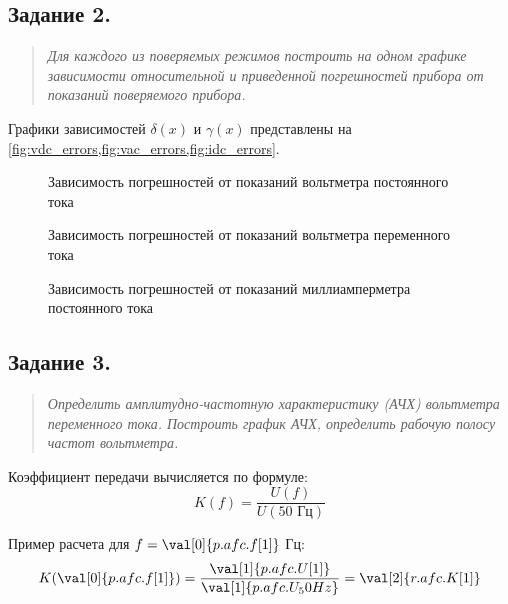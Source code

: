 \subsection*{ Задание 2. }
\begin{quote}
    \textit{Для каждого из поверяемых режимов построить на одном графике зависимости относительной и приведенной погрешностей прибора от показаний поверяемого прибора.}
\end{quote}

Графики зависимостей $\delta(x)$ и $\gamma(x)$ представлены на \cref{fig:vdc_errors,fig:vac_errors,fig:idc_errors}.

\begin{figure}[htpb]
    \centering
    
    \caption{Зависимость погрешностей от показаний вольтметра постоянного тока}
    \label{fig:vdc_errors}
\end{figure}

\begin{figure}[htpb]
    \centering
    
    \caption{Зависимость погрешностей от показаний вольтметра переменного тока}
    \label{fig:vac_errors}
\end{figure}

\begin{figure}[htpb]
    \centering
    
    \caption{Зависимость погрешностей от показаний миллиамперметра постоянного тока}
    \label{fig:idc_errors}
\end{figure}


\subsection*{ Задание 3. }
\begin{quote}
    \textit{Определить амплитудно-частотную характеристику (АЧХ) вольтметра переменного тока. Построить график АЧХ, определить рабочую полосу частот вольтметра.}
\end{quote}

Коэффициент передачи вычисляется по формуле:
\begin{equation}
    K(f) = \frac{U(f)}{U(50 \text{ Гц})}
\end{equation}

Пример расчета для $f = \val[0]{p.afc.f[1]}$ Гц:
\begin{equation}
    K(\val[0]{p.afc.f[1]}) = \frac{\val[1]{p.afc.U[1]}}{\val[1]{p.afc.U_50Hz}} = \val[2]{r.afc.K[1]}
\end{equation}

